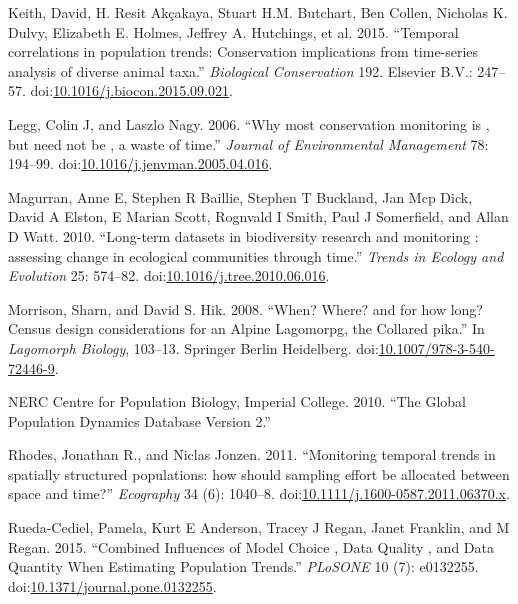 \documentclass[12pt,]{article}
\begin{document}
\hypertarget{ref-Keith2015}{}
Keith, David, H. Resit Akçakaya, Stuart H.M. Butchart, Ben Collen,
Nicholas K. Dulvy, Elizabeth E. Holmes, Jeffrey A. Hutchings, et al.
2015. ``Temporal correlations in population trends: Conservation
implications from time-series analysis of diverse animal taxa.''
\emph{Biological Conservation} 192. Elsevier B.V.: 247--57.
doi:\href{https://doi.org/10.1016/j.biocon.2015.09.021}{10.1016/j.biocon.2015.09.021}.

\hypertarget{ref-Legg2006}{}
Legg, Colin J, and Laszlo Nagy. 2006. ``Why most conservation monitoring
is , but need not be , a waste of time.'' \emph{Journal of Environmental
Management} 78: 194--99.
doi:\href{https://doi.org/10.1016/j.jenvman.2005.04.016}{10.1016/j.jenvman.2005.04.016}.

\hypertarget{ref-Magurran2010}{}
Magurran, Anne E, Stephen R Baillie, Stephen T Buckland, Jan Mcp Dick,
David A Elston, E Marian Scott, Rognvald I Smith, Paul J Somerfield, and
Allan D Watt. 2010. ``Long-term datasets in biodiversity research and
monitoring : assessing change in ecological communities through time.''
\emph{Trends in Ecology and Evolution} 25: 574--82.
doi:\href{https://doi.org/10.1016/j.tree.2010.06.016}{10.1016/j.tree.2010.06.016}.

\hypertarget{ref-Morrison2008}{}
Morrison, Sharn, and David S. Hik. 2008. ``When? Where? and for how
long? Census design considerations for an Alpine Lagomorpg, the Collared
pika.'' In \emph{Lagomorph Biology}, 103--13. Springer Berlin
Heidelberg.
doi:\href{https://doi.org/10.1007/978-3-540-72446-9}{10.1007/978-3-540-72446-9}.

\hypertarget{ref-GPDD2010}{}
NERC Centre for Population Biology, Imperial College. 2010. ``The Global
Population Dynamics Database Version 2.''

\hypertarget{ref-Rhodes2011}{}
Rhodes, Jonathan R., and Niclas Jonzen. 2011. ``Monitoring temporal
trends in spatially structured populations: how should sampling effort
be allocated between space and time?'' \emph{Ecography} 34 (6): 1040--8.
doi:\href{https://doi.org/10.1111/j.1600-0587.2011.06370.x}{10.1111/j.1600-0587.2011.06370.x}.

\hypertarget{ref-Rueda-Cediel2015}{}
Rueda-Cediel, Pamela, Kurt E Anderson, Tracey J Regan, Janet Franklin,
and M Regan. 2015. ``Combined Influences of Model Choice , Data Quality
, and Data Quantity When Estimating Population Trends.'' \emph{PLoSONE}
10 (7): e0132255.
doi:\href{https://doi.org/10.1371/journal.pone.0132255}{10.1371/journal.pone.0132255}.
\end{document}
